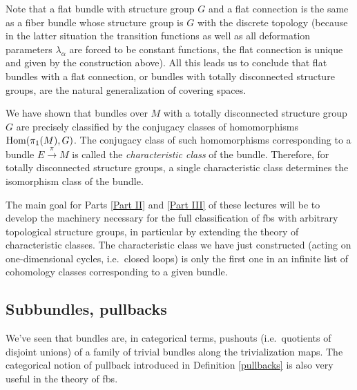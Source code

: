 \begin{example}
	Note that a flat bundle with structure group $G$ and a flat connection is the same as a fiber bundle whose structure group is $G$ with the discrete topology (because in the latter situation the transition functions as well as all deformation parameters $\lambda_\alpha$ are forced to be constant functions, the flat connection is unique and given by the construction above). All this leads us to conclude that flat bundles with a flat connection, or bundles with totally disconnected structure groups, are the natural generalization of covering spaces.
	
	We have shown that bundles over $M$ with a totally disconnected structure group $G$ are precisely classified by the conjugacy classes of homomorphisms $\operatorname{Hom}(\pi_1(M),G)$. The conjugacy class of such homomorphisms corresponding to a bundle $E\overset{\pi}{\to}M$ is called the \emph{characteristic class} of the bundle. Therefore, for totally disconnected structure groups, a single characteristic class determines the isomorphism class of the bundle.
	
	The main goal for Parts \ref{Part II} and \ref{Part III} of these lectures will be to develop the machinery necessary for the full classification of \glspl{fb} with arbitrary topological structure groups, in particular by extending the theory of characteristic classes. The characteristic class we have just constructed (acting on one-dimensional cycles, i.e.\ closed loops) is only the first one in an infinite list of cohomology classes corresponding to a given bundle.
\end{example}

\subsection{Subbundles, pullbacks}


We've seen that bundles are, in categorical terms, pushouts (i.e.\ quotients of disjoint unions) of a family of trivial bundles along the trivialization maps. The categorical notion of pullback introduced in Definition \ref{pullbacks} is also very useful in the theory of \glspl{fb}.

